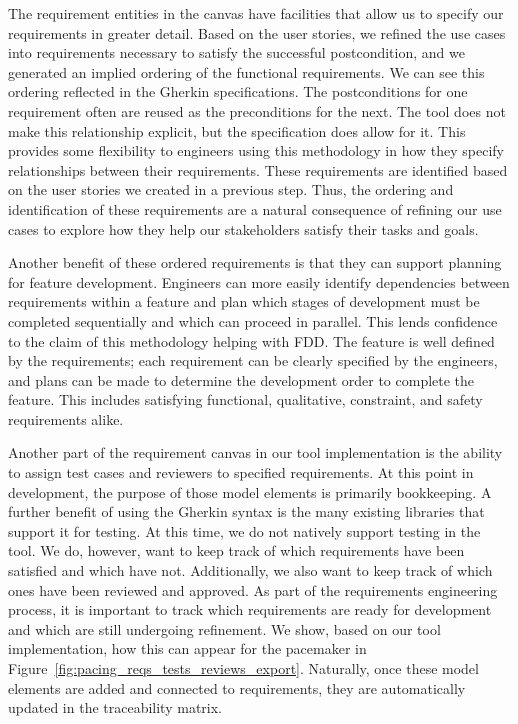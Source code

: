 The requirement entities in the canvas have facilities that allow us to specify our requirements in greater detail. Based on the user stories, we refined the use cases into requirements necessary to satisfy the successful postcondition, and we generated an implied ordering of the functional requirements. We can see this ordering reflected in the Gherkin specifications. The postconditions for one requirement often are reused as the preconditions for the next. The tool does not make this relationship explicit, but the specification does allow for it. This provides some flexibility to engineers using this methodology in how they specify relationships between their requirements. These requirements are identified based on the user stories we created in a previous step. Thus, the ordering and identification of these requirements are a natural consequence of refining our use cases to explore how they help our stakeholders satisfy their tasks and goals.

Another benefit of these ordered requirements is that they can support planning for feature development. Engineers can more easily identify dependencies between requirements within a feature and plan which stages of development must be completed sequentially and which can proceed in parallel. This lends confidence to the claim of this methodology helping with FDD. The feature is well defined by the requirements; each requirement can be clearly specified by the engineers, and plans can be made to determine the development order to complete the feature. This includes satisfying functional, qualitative, constraint, and safety requirements alike. 

Another part of the requirement canvas in our tool implementation is the ability to assign test cases and reviewers to specified requirements. At this point in development, the purpose of those model elements is primarily bookkeeping. A further benefit of using the Gherkin syntax is the many existing libraries that support it for testing. At this time, we do not natively support testing in the tool. We do, however, want to keep track of which requirements have been satisfied and which have not. Additionally, we also want to keep track of which ones have been reviewed and approved. As part of the requirements engineering process, it is important to track which requirements are ready for development and which are still undergoing refinement. We show, based on our tool implementation, how this can appear for the pacemaker in Figure~\ref{fig:pacing_reqs_tests_reviews_export}. Naturally, once these model elements are added and connected to requirements, they are automatically updated in the traceability matrix.

